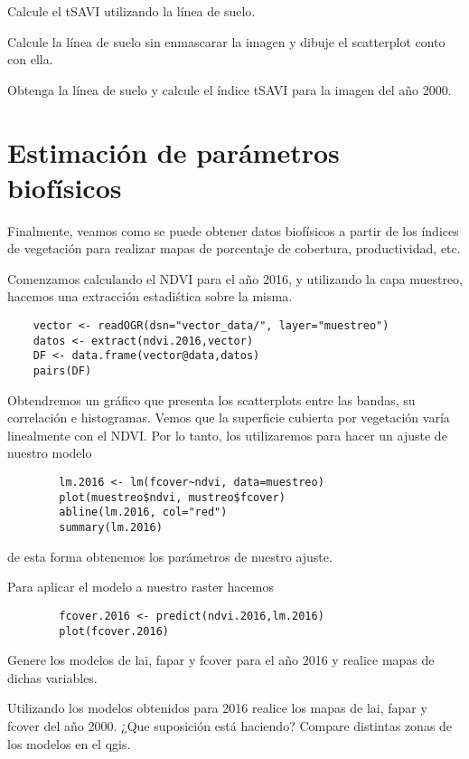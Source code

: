 \begin{act}
    Calcule el tSAVI utilizando la l\'inea de suelo.
\end{act}

\begin{act}
    Calcule la l\'inea de suelo sin enmascarar la imagen y dibuje el
    scatterplot conto con ella.
\end{act}

\begin{act}
    Obtenga la l\'inea de suelo y calcule el \'indice tSAVI para la imagen del año
    2000.
\end{act}

\section{Estimaci\'on de par\'ametros biof\'isicos}

Finalmente, veamos como se puede obtener datos biof\'isicos a partir de los
\'indices de vegetaci\'on para realizar mapas de
porcentaje de cobertura, productividad, etc.

\begin{exa}
    Comenzamos calculando el NDVI para el año 2016, y utilizando la capa
    muestreo, hacemos una extracci\'on estadi\'stica sobre la misma.
    \begin{lstlisting}
    vector <- readOGR(dsn="vector_data/", layer="muestreo")
    datos <- extract(ndvi.2016,vector)
    DF <- data.frame(vector@data,datos)
    pairs(DF)
    \end{lstlisting}

    Obtendremos un gr\'afico que presenta los scatterplots entre las bandas, su
    correlaci\'on e histogramas.
    Vemos que la superficie cubierta por vegetaci\'on var\'ia
    linealmente con el NDVI\@. Por lo tanto, los utilizaremos para hacer un ajuste de nuestro modelo

    \begin{lstlisting}
        lm.2016 <- lm(fcover~ndvi, data=muestreo)
        plot(muestreo$ndvi, mustreo$fcover)
        abline(lm.2016, col="red")
        summary(lm.2016)
    \end{lstlisting}

    de esta forma obtenemos los par\'ametros de nuestro ajuste.

    Para aplicar el modelo a nuestro raster hacemos
    \begin{lstlisting}
        fcover.2016 <- predict(ndvi.2016,lm.2016)
        plot(fcover.2016)
    \end{lstlisting}
\end{exa}

\begin{act}
    Genere los modelos de lai, fapar y fcover para el año 2016 y
    realice mapas de dichas variables.
\end{act}

\begin{act}
    Utilizando los modelos obtenidos para 2016 realice
    los mapas de lai, fapar y fcover del año 2000. ¿Que suposici\'on est\'a
    haciendo? Compare distintas zonas de los modelos en el qgis.
\end{act}
